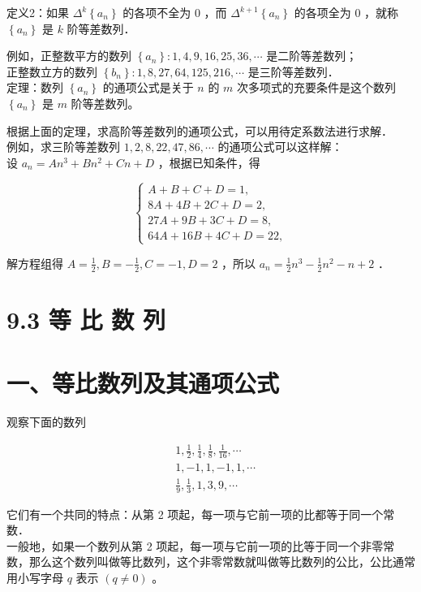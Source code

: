 \documentclass[10pt]{article}
\begin{document}
定义2：如果 \(\Delta^{k}\left\{a_{n}\right\}\) 的各项不全为 0 ，而 \(\Delta^{k+1}\left\{a_{n}\right\}\) 的各项全为 0 ，就称 \(\left\{a_{n}\right\}\) 是 \(k\) 阶等差数列．

例如，正整数平方的数列 \(\left\{a_{n}\right\}: 1,4,9,16,25,36, \cdots\) 是二阶等差数列；\\
正整数立方的数列 \(\left\{b_{n}\right\}: 1,8,27,64,125,216, \cdots\) 是三阶等差数列．\\
定理：数列 \(\left\{a_{n}\right\}\) 的通项公式是关于 \(n\) 的 \(m\) 次多项式的充要条件是这个数列 \(\left\{a_{n}\right\}\) 是 \(m\) 阶等差数列。

根据上面的定理，求高阶等差数列的通项公式，可以用待定系数法进行求解．\\
例如，求三阶等差数列 \(1,2,8,22,47,86, \cdots\) 的通项公式可以这样解：\\
设 \(a_{n}=A n^{3}+B n^{2}+C n+D\) ，根据已知条件，得

\[
\left\{\begin{array}{l}
A+B+C+D=1, \\
8 A+4 B+2 C+D=2, \\
27 A+9 B+3 C+D=8, \\
64 A+16 B+4 C+D=22,
\end{array}\right.
\]

解方程组得 \(A=\frac{1}{2}, B=-\frac{1}{2}, C=-1, D=2\) ，所以 \(a_{n}=\frac{1}{2} n^{3}-\frac{1}{2} n^{2}-n+2\) ．

\section*{9.3 等 比 数 列}
\section*{一、等比数列及其通项公式}
观察下面的数列

\[
\begin{aligned}
& 1, \frac{1}{2}, \frac{1}{4}, \frac{1}{8}, \frac{1}{16}, \cdots \\
& 1,-1,1,-1,1, \cdots \\
& \frac{1}{9}, \frac{1}{3}, 1,3,9, \cdots
\end{aligned}
\]

它们有一个共同的特点：从第 2 项起，每一项与它前一项的比都等于同一个常数．\\
一般地，如果一个数列从第 2 项起，每一项与它前一项的比等于同一个非零常数，那么这个数列叫做等比数列，这个非零常数就叫做等比数列的公比，公比通常用小写字母 \(q\) 表示 \((q \neq 0)\) 。
\end{document}
